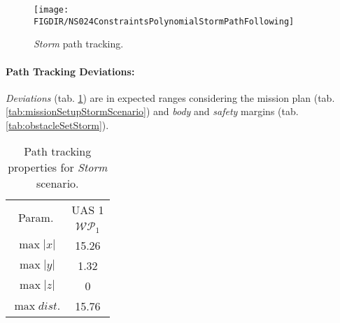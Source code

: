     \begin{figure}[H]
        \centering
        \texttt{[image: \\FIGDIR/NS024ConstraintsPolynomialStormPathFollowing]} 
        \caption{\emph{Storm} path tracking.}
        \label{fig:testCaseStormPathTracking}
    \end{figure}
    
    \paragraph{Path Tracking Deviations:} \emph{Deviations} (tab. \ref{tab:pathTrackingParametersForStormAvoidance}) are in expected ranges considering the mission plan (tab. \ref{tab:missionSetupStormScenario}) and \emph{body} and \emph{safety} margins (tab. \ref{tab:obstacleSetStorm}).
    
    \begin{table}[H]
        \centering
        \begin{tabular}{c||c}
            \multirow{2}{*}{Param.} & UAS 1\\\cline{2-2}
                            & $\mathscr{WP}_1$  \\\hline\hline
              $\max |x|$    & 15.26             \\\hline
              $\max |y|$    & 1.32             \\\hline
              $\max |z|$    & 0                 \\\hline
              $\max dist.$  & 15.76             \\
        \end{tabular}
        \caption{Path tracking properties for \emph{Storm} scenario.}
        \label{tab:pathTrackingParametersForStormAvoidance}
    \end{table}
    
    
